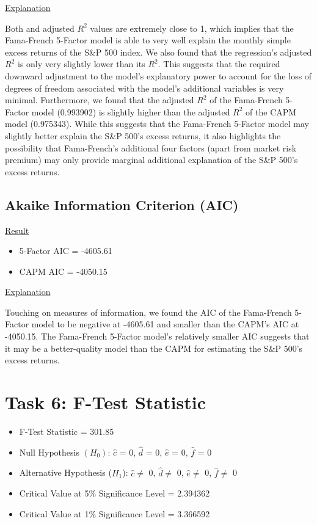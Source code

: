 \documentclass[a4paper]{article}
\begin{document}
\underline{Explanation}

Both and adjusted $R^2$ values are extremely close to 1, which implies that the Fama-French 5-Factor model is able to very well explain the monthly simple excess returns of the S\&P 500 index. 
We also found that the regression’s adjusted $R^2$ is only very slightly lower than its $R^2$. This suggests that the required downward adjustment to the model’s explanatory power to account for the loss of degrees of freedom associated with the model’s additional variables is very minimal. 
Furthermore, we found that the adjusted $R^2$ of the Fama-French 5-Factor model (0.993902) is slightly higher than the adjusted $R^2$ of the CAPM model (0.975343). While this suggests that the Fama-French 5-Factor model may slightly better explain the S\&P 500’s excess returns, it also highlights the possibility that Fama-French’s additional four factors (apart from market risk premium) may only provide marginal additional explanation of the S\&P 500’s excess returns. 

\subsection{Akaike Information Criterion (AIC)}
\underline{Result}
\begin{itemize}
	\item 5-Factor AIC = -4605.61
	\item CAPM AIC = -4050.15
\end{itemize}

\underline{Explanation}

Touching on measures of information, we found the AIC of the Fama-French 5-Factor model to be negative at -4605.61 and smaller than the CAPM’s AIC at -4050.15. The Fama-French 5-Factor model’s relatively smaller AIC suggests that it may be a better-quality model than the CAPM for estimating the S\&P 500’s excess returns. 

\newpage
\setcounter{secnumdepth}{1}
\section*{Task 6: F-Test Statistic}
\label{sec:introduction}

\begin{itemize}
	\item F-Test Statistic = 301.85
	\item Null Hypothesis $(H_0)$: $\hat{c}$ = 0, $\hat{d}$ = 0, $\hat{e}$ = 0, $\hat{f}$ = 0
	\item Alternative Hypothesis ($H_1$): $\hat{c}\ne$ 0, $\hat{d}\ne$ 0, $\hat{e} \ne$ 0, $\hat{f}\ne$ 0
	\item Critical Value at 5\% Significance Level = 2.394362
	\item Critical Value at 1\% Significance Level = 3.366592
\end{itemize}
\end{document}
